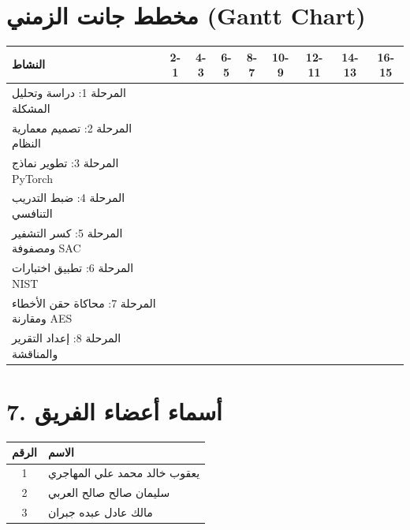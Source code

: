 \documentclass[12pt,a4paper]{article}
\begin{document}
\section*{مخطط جانت الزمني (Gantt Chart)}
\begin{center}
\begin{tabular}{|l|c|c|c|c|c|c|c|c|}
\hline
\rowcolor{navyblue} \color{white}\textbf{النشاط} & \color{white}\textbf{2-1} & \color{white}\textbf{4-3} & \color{white}\textbf{6-5} & \color{white}\textbf{8-7} & \color{white}\textbf{10-9} & \color{white}\textbf{12-11} & \color{white}\textbf{14-13} & \color{white}\textbf{16-15} \\
\hline
المرحلة 1: دراسة وتحليل المشكلة & \cellcolor{lightblue} & & & & & & & \\
\hline
المرحلة 2: تصميم معمارية النظام & & \cellcolor{lightblue} & & & & & & \\
\hline
المرحلة 3: تطوير نماذج PyTorch & & & \cellcolor{lightblue} & & & & & \\
\hline
المرحلة 4: ضبط التدريب التنافسي & & & & \cellcolor{lightblue} & & & & \\
\hline
المرحلة 5: كسر التشفير ومصفوفة SAC & & & & & \cellcolor{lightblue} & & & \\
\hline
المرحلة 6: تطبيق اختبارات NIST & & & & & & \cellcolor{lightblue} & & \\
\hline
المرحلة 7: محاكاة حقن الأخطاء ومقارنة AES & & & & & & & \cellcolor{lightblue} & \\
\hline
المرحلة 8: إعداد التقرير والمناقشة & & & & & & & & \cellcolor{lightblue} \\
\hline
\end{tabular}
\end{center}

\vspace{1.5cm}
\section*{7. أسماء أعضاء الفريق}
\begin{center}
\begin{tabular}{|c|p{10cm}|}
\hline
\rowcolor{navyblue} \color{white}\textbf{الرقم} & \color{white}\textbf{الاسم} \\
\hline
1 & يعقوب خالد محمد علي المهاجري \\
\hline
2 & سليمان صالح صالح العربي \\
\hline
3 & مالك عادل عبده جبران \\
\hline
\end{tabular}
\end{center}
\end{document}
